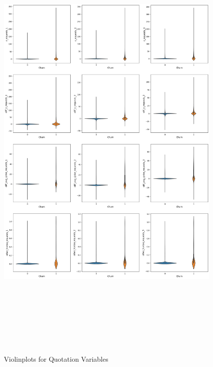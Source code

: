 \documentclass[12pt,titlepage]{article}
\begin{document}
\begin{figure}[H]
    \centerline{\includegraphics[height=23cm]{violin1.png}}
\caption{Violinplots for Quotation Variables}
\label{fig:edaq}
\end{figure}
\end{document}

